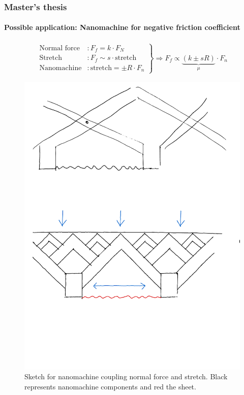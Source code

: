 \documentclass[
	10pt, %
]{beamer}
\begin{document}
\begin{frame}
	\frametitle{Master's thesis}
	\framesubtitle{Possible application: Nanomachine for negative friction coefficient}

	\begin{align*}
		\left.\begin{aligned}
			\text{Normal force} &: F_f = k \cdot F_N \\
			\text{Stretch} &: F_f \sim s \cdot \text{stretch}  \\
			\text{Nanomachine}&: \text{stretch} = \pm R \cdot F_n
		  \end{aligned}\right\} \Longrightarrow F_f \propto \underbrace{(k \pm sR)}_{\mu} \cdot F_n
	\end{align*}
	
	
	\begin{figure}
		\includegraphics[width=0.6\linewidth]{figures/nanomachine.pdf}
		\caption{Sketch for nanomachine coupling normal force and stretch. Black represents nanomachine components and red the sheet.}
	\end{figure}	
	
\end{frame}



	
\end{document}
